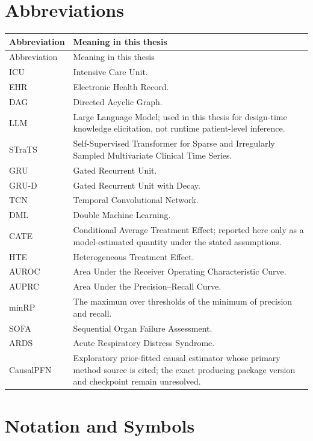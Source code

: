 \chapter*{Abbreviations}

\begin{longtable}{@{}L{0.20\textwidth}L{0.72\textwidth}@{}}
\toprule
Abbreviation & Meaning in this thesis \\
\midrule
\endfirsthead
\toprule
Abbreviation & Meaning in this thesis \\
\midrule
\endhead
\bottomrule
\endfoot
ICU & Intensive Care Unit. \\
EHR & Electronic Health Record. \\
DAG & Directed Acyclic Graph. \\
LLM & Large Language Model; used in this thesis for design-time knowledge elicitation, not runtime patient-level inference. \\
STraTS & Self-Supervised Transformer for Sparse and Irregularly Sampled Multivariate Clinical Time Series. \\
GRU & Gated Recurrent Unit. \\
GRU-D & Gated Recurrent Unit with Decay. \\
TCN & Temporal Convolutional Network. \\
DML & Double Machine Learning. \\
CATE & Conditional Average Treatment Effect; reported here only as a model-estimated quantity under the stated assumptions. \\
HTE & Heterogeneous Treatment Effect. \\
AUROC & Area Under the Receiver Operating Characteristic Curve. \\
AUPRC & Area Under the Precision--Recall Curve. \\
minRP & The maximum over thresholds of the minimum of precision and recall. \\
SOFA & Sequential Organ Failure Assessment. \\
ARDS & Acute Respiratory Distress Syndrome. \\
CausalPFN & Exploratory prior-fitted causal estimator whose primary method source is cited; the exact producing package version and checkpoint remain unresolved. \\
\end{longtable}

\clearpage
\chapter*{Notation and Symbols}

